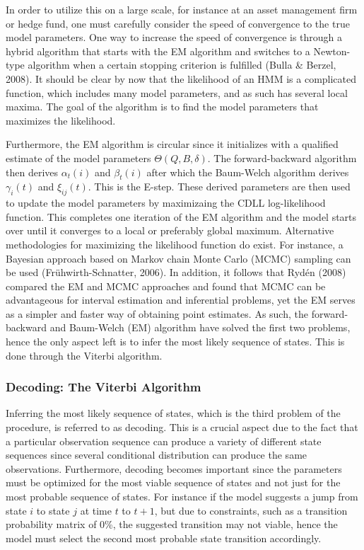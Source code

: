 In order to utilize this on a large scale, for instance at an asset management firm or hedge fund, one must carefully consider the speed of convergence to the true model parameters. One way to increase the speed of convergence is through a hybrid algorithm that starts with the EM algorithm and switches to a Newton-type algorithm when a certain stopping criterion is fulfilled (Bulla \& Berzel, 2008). It should be clear by now that the likelihood of an HMM is a complicated function, which includes many model parameters, and as such has several local maxima. The goal of the algorithm is to find the model parameters that maximizes the likelihood. 

Furthermore, the EM algorithm is circular since it initializes with a qualified estimate of the model parameters $\Theta(Q, B,\delta)$. The forward-backward algorithm then derives $\alpha_t(i)$ and $\beta_t(i)$ after which the Baum-Welch algorithm derives $\gamma_i(t)$ and $\xi_{ij}(t)$. This is the E-step. These derived parameters are then used to update the model parameters by maximizaing the CDLL log-likelihood function. This completes one iteration of the EM algorithm and the model starts over until it converges to a local or preferably global maximum. Alternative methodologies for maximizing the likelihood function do exist. For instance, a Bayesian approach based on Markov chain Monte Carlo (MCMC) sampling can be used (Frühwirth-Schnatter, 2006). In addition, it follows that Rydén (2008) compared the EM and MCMC approaches and found that MCMC can be advantageous for interval estimation and inferential problems, yet the EM serves as a simpler and faster way of obtaining point estimates. As such, the forward-backward and Baum-Welch (EM) algorithm have solved the first two problems, hence the only aspect left is to infer the most likely sequence of states. This is done through the Viterbi algorithm. 
 
\subsubsection{Decoding: The Viterbi Algorithm}
\label{subsection: Decoding}

Inferring the most likely sequence of states, which is the third problem of the \mle procedure, is referred to as decoding. This is a crucial aspect due to the fact that a particular observation sequence can produce a variety of different state sequences since several conditional distribution can produce the same observations. Furthermore, decoding becomes important since the parameters must be optimized for the most viable sequence of states and not just for the most probable sequence of states. For instance if the model suggests a jump from state $i$ to state $j$ at time $t$ to $t+1$, but due to constraints, such as a transition probability matrix of 0\%, the suggested transition may not viable, hence the model must select the second most probable state transition accordingly. 


